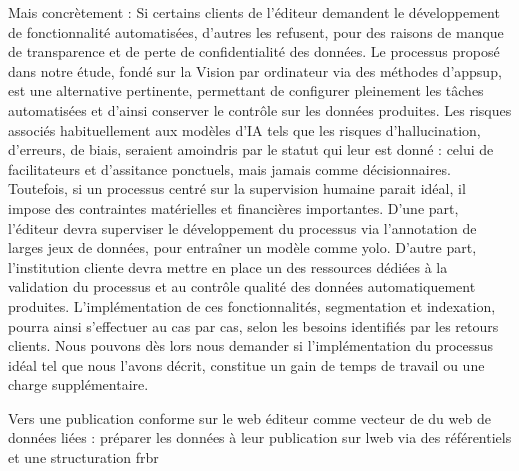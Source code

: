 Mais concrètement : 
Si certains clients de l'éditeur demandent le développement de fonctionnalité automatisées, d'autres les refusent, pour des raisons de manque de transparence et de perte de confidentialité des données. Le processus proposé dans notre étude, fondé sur la \gls{Vision par ordinateur} via des méthodes d'\gls{appsup}, est une alternative pertinente, permettant de configurer pleinement les tâches automatisées et d'ainsi conserver le contrôle sur les données produites. Les risques associés habituellement aux modèles d'IA tels que les risques d'hallucination, d'erreurs, de biais, seraient amoindris par le statut qui leur est donné : celui de facilitateurs et d'assitance ponctuels, mais jamais comme décisionnaires. 
Toutefois, si un processus centré sur la supervision humaine parait idéal, il impose des contraintes matérielles et financières importantes. D'une part, l'éditeur devra superviser le développement du processus via l'annotation de larges jeux de données, pour entraîner un modèle comme \gls{yolo}. D'autre part, l'institution cliente devra mettre en place un des ressources dédiées à la validation du processus et au contrôle qualité des données automatiquement produites. L'implémentation de ces fonctionnalités, segmentation et indexation, pourra ainsi s'effectuer au cas par cas, selon les besoins identifiés par les retours clients. Nous pouvons dès lors nous demander si l'implémentation du processus idéal tel que nous l'avons décrit, constitue un gain de temps de travail ou une charge supplémentaire. 

Vers une publication conforme sur le web 
éditeur comme vecteur de du web de données liées : préparer les données à leur publication sur lweb via des référentiels et une structuration frbr 

